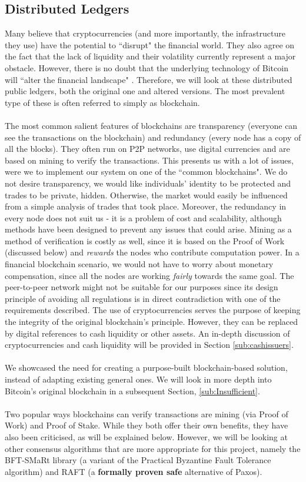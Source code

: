 \documentclass[12pt,twoside]{article}
\begin{document}
\subsection{Distributed Ledgers}
\label{sub:DistributedLedgers}
Many believe that cryptocurrencies (and more importantly, the infrastructure they use) have the potential to ``disrupt" the financial world. They also agree on the fact that the lack of liquidity and their volatility currently represent a major obstacle. However, there is no doubt that the underlying technology of Bitcoin will ``alter the financial landscape" \cite{CMM:RN}. Therefore, we will look at these distributed public ledgers, both the original one and altered versions. The most prevalent type of these is often referred to simply as blockchain.
\\ \\
The most common salient features of blockchains are transparency (everyone can see the transactions on the blockchain) and redundancy (every node has a copy of all the blocks). They often run on P2P networks, use digital currencies and are based on mining to verify the transactions. This presents us with a lot of issues, were we to implement our system on one of the ``common blockchains". We do not desire transparency, we would like individuals' identity to be protected and trades to be private, hidden. Otherwise, the market would easily be influenced from a simple analysis of trades that took place. Moreover, the redundancy in every node does not suit us - it is a problem of cost and scalability, although methods have been designed to prevent any issues that could arise. Mining as a method of verification is costly as well, since it is based on the Proof of Work (discussed below) and \textit{rewards} the nodes who contribute computation power. In a financial blockchain scenario, we would not have to worry about monetary compensation, since all the nodes are working \textit{fairly} towards the same goal. The peer-to-peer network might not be suitable for our purposes since its design principle of avoiding all regulations is in direct contradiction with one of the requirements described. The use of cryptocurrencies serves the purpose of keeping the integrity of the original blockchain's principle. However, they can be replaced by digital references to cash liquidity or other assets. An in-depth discussion of cryptocurrencies and cash liquidity will be provided in Section \ref{sub:cashissuers}.
\\ \\
We showcased the need for creating a purpose-built blockchain-based solution, instead of adapting existing general ones. We will look in more depth into Bitcoin's original blockchain in a subsequent Section, \ref{sub:Insufficient}.
\\ \\
Two popular ways blockchains can verify transactions are mining (via Proof of Work) and Proof of Stake. While they both offer their own benefits, they have also been criticised, as will be explained below. However, we will be looking at other consensus algorithms that are more appropriate for this project, namely the BFT-SMaRt library (a variant of the Practical Byzantine Fault Tolerance algorithm) and RAFT (a \textbf{formally proven safe} alternative of Paxos).
\end{document}
